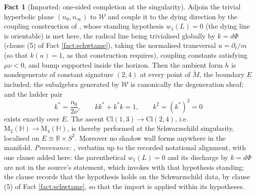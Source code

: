 \documentclass[11pt]{article}
\theoremstyle{definition}
\newtheorem{fact}[theorem]{Fact}
\newcommand{\Cl}{\mathrm{Cl}}
\newcommand{\R}{\mathbb{R}}
\newcommand{\HH}{\mathbb{H}}
\newcommand{\Mat}{\mathrm{M}}
\newcommand{\nO}{n_0}
\newcommand{\nInf}{n_\infty}
\newcommand{\shW}{\mathcal{W}}
\newcommand{\shL}{L}
\newcommand{\Mt}{\widetilde{M}}
\begin{document}
\begin{fact}[Imported: one-sided completion at the singularity]\label{fact:schwcompletion}
Adjoin the trivial hyperbolic plane $(\nO, \nInf)$ to $\shW$ and couple it to the dying direction by the coupling construction of \cite[Def.~4.1]{ButlerT4}, whose standing hypothesis $w_1(\shL) = 0$ (the dying line is orientable) is met here, the radical line being trivialised globally by $k = d\Phi$ (clause (5) of Fact \ref{fact:schwtame}), taking the normalised transversal $u = \partial_t/m$ (so that $k(u) = 1$, as that construction requires), coupling constants satisfying $\mu\nu < 0$, and bump supported inside the horizon. Then the ambient form $h$ is nondegenerate of constant signature $(2,4)$ at every point of $\Mt$, the boundary $E$ included; the subalgebra generated by $\shW$ is canonically the degeneration sheaf; and the ladder pair
\[
k^* = \frac{\nO}{2\nu}, \qquad k k^* + k^* k = 1, \qquad k^2 = (k^*)^2 = 0
\]
exists exactly over $E$. The ascent $\Cl(1,3) \to \Cl(2,4)$, i.e.\ $\Mat_2(\HH) \to \Mat_4(\HH)$, is thereby performed at the Schwarzschild singularity, localised on $E \cong \R \times S^2$. Moreover no shadow wall forms anywhere in the manifold.
\emph{Provenance:} \cite[Thm.~8.12]{ButlerT4}, verbatim up to the recorded notational alignment, with one clause added here: the parenthetical $w_1(\shL) = 0$ and its discharge by $k = d\Phi$ are not in the source's statement, which invokes \cite[Def.~4.1]{ButlerT4} with that hypothesis standing; the clause records that the hypothesis holds on the Schwarzschild data, by clause (5) of Fact \ref{fact:schwtame}, so that the import is applied within its hypotheses.
\end{fact}
\end{document}
